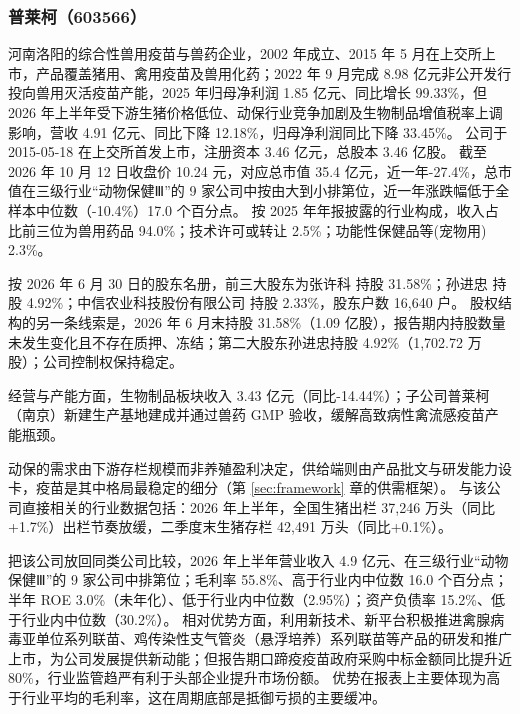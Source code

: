 \subsubsection{普莱柯（603566）}
\label{co:603566}

 河南洛阳的综合性兽用疫苗与兽药企业，2002 年成立、2015 年 5 月在上交所上市，产品覆盖猪用、禽用疫苗及兽用化药；2022 年 9 月完成 8.98 亿元非公开发行投向兽用灭活疫苗产能，2025 年归母净利润 1.85 亿元、同比增长 99.33\%，但 2026 年上半年受下游生猪价格低位、动保行业竞争加剧及生物制品增值税率上调影响，营收 4.91 亿元、同比下降 12.18\%，归母净利润同比下降 33.45\%。 公司于 2015-05-18 在上交所首发上市，注册资本 3.46 亿元，总股本 3.46 亿股。 截至 2026 年 10 月 12 日收盘价 10.24 元，对应总市值 35.4 亿元，近一年-27.4\%，总市值在三级行业“动物保健Ⅲ”的 9 家公司中按由大到小排第位，近一年涨跌幅低于全样本中位数（-10.4\%）17.0 个百分点。 按 2025 年年报披露的行业构成，收入占比前三位为兽用药品 94.0\%；技术许可或转让 2.5\%；功能性保健品等(宠物用) 2.3\%。

 按 2026 年 6 月 30 日的股东名册，前三大股东为张许科 持股 31.58\%；孙进忠 持股 4.92\%；中信农业科技股份有限公司 持股 2.33\%，股东户数 16,640 户。 股权结构的另一条线索是，2026 年 6 月末持股 31.58\%（1.09 亿股），报告期内持股数量未发生变化且不存在质押、冻结；第二大股东孙进忠持股 4.92\%（1,702.72 万股）；公司控制权保持稳定。

 经营与产能方面，生物制品板块收入 3.43 亿元（同比-14.44\%）；子公司普莱柯（南京）新建生产基地建成并通过兽药 GMP 验收，缓解高致病性禽流感疫苗产能瓶颈。

 动保的需求由下游存栏规模而非养殖盈利决定，供给端则由产品批文与研发能力设卡，疫苗是其中格局最稳定的细分（第 \ref{sec:framework} 章的供需框架）。 与该公司直接相关的行业数据包括：2026 年上半年，全国生猪出栏 37,246 万头（同比+1.7\%）出栏节奏放缓，二季度末生猪存栏 42,491 万头（同比+0.1\%）。

 把该公司放回同类公司比较，2026 年上半年营业收入 4.9 亿元、在三级行业“动物保健Ⅲ”的 9 家公司中排第位；毛利率 55.8\%、高于行业内中位数 16.0 个百分点；半年 ROE 3.0\%（未年化）、低于行业内中位数（2.95\%）；资产负债率 15.2\%、低于行业内中位数（30.2\%）。 相对优势方面，利用新技术、新平台积极推进禽腺病毒亚单位系列联苗、鸡传染性支气管炎（悬浮培养）系列联苗等产品的研发和推广上市，为公司发展提供新动能；但报告期口蹄疫疫苗政府采购中标金额同比提升近 80\%，行业监管趋严有利于头部企业提升市场份额。 优势在报表上主要体现为高于行业平均的毛利率，这在周期底部是抵御亏损的主要缓冲。

